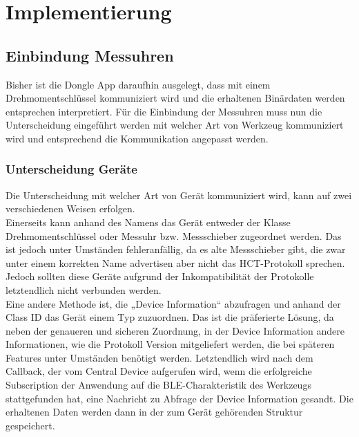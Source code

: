 \section{Implementierung}
\subsection{Einbindung Messuhren}
Bisher ist die Dongle App daraufhin ausgelegt, dass mit einem Drehmomentschlüssel kommuniziert wird und die erhaltenen Binärdaten werden entsprechen interpretiert. Für die Einbindung der Messuhren muss nun die Unterscheidung eingeführt werden mit welcher Art von Werkzeug kommuniziert wird und entsprechend die Kommunikation angepasst werden.

\subsubsection{Unterscheidung Geräte}
Die Unterscheidung mit welcher Art von Gerät kommuniziert wird, kann auf zwei verschiedenen Weisen erfolgen. \\
Einerseits kann anhand des Namens das Gerät entweder der Klasse Drehmomentschlüssel oder Messuhr bzw. Messschieber zugeordnet werden. Das ist jedoch unter Umständen fehleranfällig, da es alte Messschieber gibt, die zwar unter einem korrekten Name advertisen aber nicht das HCT-Protokoll sprechen. Jedoch sollten diese Geräte aufgrund der Inkompatibilität der Protokolle letztendlich nicht verbunden werden. \\
Eine andere Methode ist, die „Device Information“ abzufragen und anhand der Class ID das Gerät einem Typ zuzuordnen. Das ist die präferierte Lösung, da neben der genaueren und sicheren Zuordnung, in der Device Information andere Informationen, wie die Protokoll Version mitgeliefert werden, die bei späteren Features unter Umständen benötigt werden.
Letztendlich wird nach dem Callback, der vom Central Device aufgerufen wird, wenn die erfolgreiche Subscription der Anwendung auf die BLE-Charakteristik des Werkzeugs stattgefunden hat, eine Nachricht zu Abfrage der Device Information gesandt. Die erhaltenen Daten werden dann in der zum Gerät gehörenden Struktur gespeichert.
 
